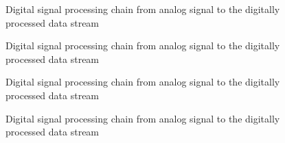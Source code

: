 \documentclass[a4paper,oneside]{alpenthesis/alpenthesis}
\begin{document}
\begin{figure}
    \centering
    
    \caption{Digital signal processing chain from analog signal to the digitally processed data stream}
    \label{fig:aliasing:dirac}
\end{figure}

\begin{figure}
    \centering
    
    \caption{Digital signal processing chain from analog signal to the digitally processed data stream}
    \label{fig:filtertopologies:fir}
\end{figure}

\begin{figure}
    \centering
    
    \caption{Digital signal processing chain from analog signal to the digitally processed data stream}
    \label{fig:filtertopologies:iir}
\end{figure}

\begin{figure}
    \centering
    
    \caption{Digital signal processing chain from analog signal to the digitally processed data stream}
    \label{fig:filtertopologies:cic}
\end{figure}

\end{document}
